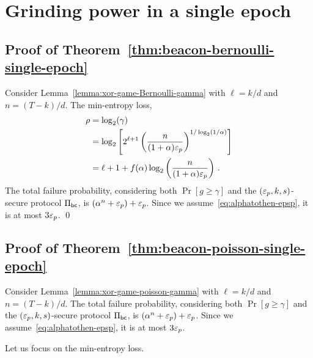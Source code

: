 
\section{Grinding power in a single epoch}

\subsection*{Proof of Theorem~\ref{thm:beacon-bernoulli-single-epoch}}
  Consider Lemma~\ref{lemma:xor-game-Bernoulli-gamma} 
  with $\ell = k/d$ and $n = (T-k)/d$. 
  The min-entropy loss, 
  \begin{align*}
    \rho &= \log_2(\gamma) \\
        &= \log_2 \left[  2^{\ell + 1} \left(
                \frac{n}{(1+\alpha)\mathsf{\varepsilon}_p}
            \right)^{1/\log_2(1/\alpha)}\right] \\
        &= \ell + 1 + f(\alpha) \log_2\left(\frac{n}{(1+\alpha)\mathsf{\varepsilon}_p}\right)
        \,.
  \end{align*}
  The total failure probability, 
  considering both $\Pr[g \geq \gamma]$ and 
  the $(\mathsf{\varepsilon}_p, k, s)$-secure protocol $\Pi_\mathsf{bc}$, 
  is $(\alpha^n + \mathsf{\varepsilon}_p) + \mathsf{\varepsilon}_p$. 
  Since we assume~\eqref{eq:alphatothen-epsp}, it is at most $3 \mathsf{\varepsilon}_p$.
\hfill\qed

\subsection*{Proof of Theorem~\ref{thm:beacon-poisson-single-epoch}}
  Consider Lemma~\ref{lemma:xor-game-poisson-gamma} 
  with $\ell = k/d$ and $n = (T-k)/d$. 
  The total failure probability, 
  considering both $\Pr[g \geq \gamma]$ and 
  the $(\mathsf{\varepsilon}_p, k, s)$-secure protocol $\Pi_\mathsf{bc}$, 
  is $(\alpha^n + \mathsf{\varepsilon}_p) + \mathsf{\varepsilon}_p$. 
  Since we assume~\eqref{eq:alphatothen-epsp}, it is at most $3 \mathsf{\varepsilon}_p$.

  Let us focus on the min-entropy loss.

